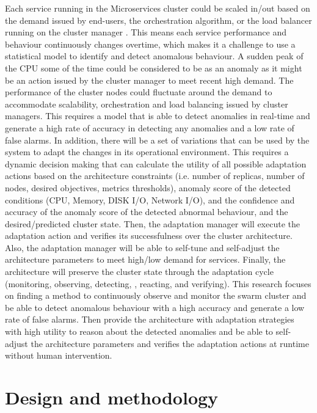 \documentclass[sigconf]{acmart}
\begin{document}
 Each service running in the Microservices cluster could be scaled in/out based on the demand issued by end-users, the orchestration algorithm, or the load balancer running on the cluster manager \cite{stubbs2015distributed}. This means each service performance and behaviour continuously changes overtime, which makes it a challenge to use a statistical model to identify and detect anomalous behaviour. A sudden peak of the CPU some of the time could be considered to be as an anomaly as it might be an action issued by the cluster manager to meet recent high demand. The performance of the cluster nodes could fluctuate around the demand to accommodate scalability, orchestration and load balancing issued by cluster managers. This requires a model that is able to detect anomalies in real-time and generate a high rate of accuracy in detecting any anomalies and a low rate of false alarms. In addition, there will be a set of variations that can be used by the system to adapt the changes in its operational environment. This requires a dynamic decision making that can calculate the utility of all possible adaptation actions based on the architecture constraints (i.e. number of replicas, number of nodes, desired objectives, metrics thresholds), anomaly score of the detected conditions (CPU, Memory, DISK I/O, Network I/O), and the confidence and accuracy of the anomaly score of the detected abnormal behaviour, and the desired/predicted cluster state. Then, the adaptation manager will execute the adaptation action and verifies its successfulness over the cluster architecture. Also, the adaptation manager will be able to self-tune and self-adjust the architecture parameters to meet high/low demand for services. Finally, the architecture will preserve the cluster state through the adaptation cycle (monitoring, observing, detecting, , reacting, and verifying).
 This research focuses on finding a method to continuously observe and monitor the swarm cluster and be able to detect anomalous behaviour with a high accuracy and generate a low rate of false alarms. Then provide the architecture with adaptation strategies with high utility to reason about the detected anomalies and be able to self-adjust the architecture parameters and verifies the adaptation actions at runtime without human intervention.


\section{Design and methodology}
\label{sec:modelling}
\end{document}
